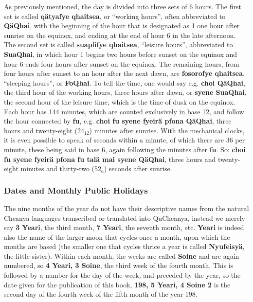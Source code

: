 \documentclass{article}
\begin{document}
As previously mentioned, the day is divided into three sets of 6 hours.  The first set is called \textbf{q\"atyafye qhaitsea}, or ``working hours'', often abbreviated to \textbf{Q\"aQhai}, with the beginning of the hour that is designated as 1 one hour after sunrise on the equinox, and ending at the end of hour 6 in the late afternoon.  The second set is called \textbf{suapfifye qhaitsea}, ``leisure hours'', abbreviated to \textbf{SuaQhai}, in which hour 1 begins two hours before sunset on the equinox and hour 6 ends four hours after sunset on the equinox.  The remaining hours, from four hours after sunset to an hour after the next dawn, are \textbf{fosorofye qhaitsea}, ``sleeping hours'', or \textbf{FoQhai}.  To tell the time, one would say e.g. \textbf{choi Q\"aQhai}, the third hour of the working hours, three hours after dawn, or \textbf{syene SuaQhai}, the second hour of the leisure time, which is the time of dusk on the equinox.  Each hour has 144 minutes, which are counted exclusively in base 12, and follow the hour connected by \textbf{fu}, e.g. \textbf{choi fu syene fyeir\"a pfona Q\"aQhai}, three hours and twenty-eight (24$_{12}$) minutes after sunrise.  With the mechanical clocks, it is even possible to speak of seconds within a minute, of which there are 36 per minute, these being said in base 6, again following the minutes after \textbf{fu}.  So: \textbf{choi fu syene fyeir\"a pfona fu tal\"a mai syene Q\"aQhai}, three hours and twenty-eight minutes and thirty-two (52$_6$) seconds after sunrise.

\subsubsection{Dates and Monthly Public Holidays}

The nine months of the year do not have their descriptive names from the natural Cheanya languages transcribed or translated into QuCheanya, instead we merely say \textbf{3 Yeari}, the third month, \textbf{7 Yeari}, the seventh month, etc.  \textbf{Yeari} is indeed also the name of the larger moon that cycles once a month, upon which the months are based (the smaller one that cycles thrice a year is called \textbf{Nyufeisy\"a}, the little sister).  Within each month, the weeks are called \textbf{Soine} and are again numbered, so \textbf{4 Yeari, 3 Soine}, the third week of the fourth month.  This is followed by a number for the day of the week, and preceded by the year, so the date given for the publication of this book, \textbf{198, 5 Yeari, 4 Soine 2} is the second day of the fourth week of the fifth month of the year 198.
\end{document}
